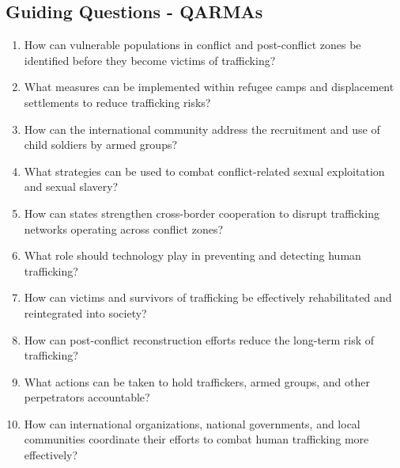 \subsection{Guiding Questions - QARMAs}

\begin{enumerate}
  \item How can vulnerable populations in conflict and post-conflict zones be identified before they become victims of trafficking?
  \item What measures can be implemented within refugee camps and displacement settlements to reduce trafficking risks?
  \item How can the international community address the recruitment and use of child soldiers by armed groups?
  \item What strategies can be used to combat conflict-related sexual exploitation and sexual slavery?
  \item How can states strengthen cross-border cooperation to disrupt trafficking networks operating across conflict zones?
  \item What role should technology play in preventing and detecting human trafficking?
  \item How can victims and survivors of trafficking be effectively rehabilitated and reintegrated into society?
  \item How can post-conflict reconstruction efforts reduce the long-term risk of trafficking?
  \item What actions can be taken to hold traffickers, armed groups, and other perpetrators accountable?
  \item How can international organizations, national governments, and local communities coordinate their efforts to combat human trafficking more effectively?
\end{enumerate}
